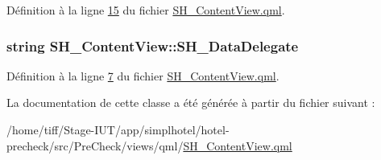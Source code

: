 Définition à la ligne \hyperlink{SH__ContentView_8qml_source_l00015}{15} du fichier \hyperlink{SH__ContentView_8qml_source}{S\-H\-\_\-\-Content\-View.\-qml}.

\hypertarget{classSH__ContentView_a61539dec6a9f22a4bab8fad98231e549}{
\subsubsection[{S\-H\-\_\-\-Data\-Delegate}]{\setlength{\rightskip}{0pt plus 5cm}string S\-H\-\_\-\-Content\-View\-::\-S\-H\-\_\-\-Data\-Delegate}}\label{classSH__ContentView_a61539dec6a9f22a4bab8fad98231e549}


Définition à la ligne \hyperlink{SH__ContentView_8qml_source_l00007}{7} du fichier \hyperlink{SH__ContentView_8qml_source}{S\-H\-\_\-\-Content\-View.\-qml}.



La documentation de cette classe a été générée à partir du fichier suivant \-:\begin{DoxyCompactItemize}
\item 
/home/tiff/\-Stage-\/\-I\-U\-T/app/simplhotel/hotel-\/precheck/src/\-Pre\-Check/views/qml/\hyperlink{SH__ContentView_8qml}{S\-H\-\_\-\-Content\-View.\-qml}\end{DoxyCompactItemize}
